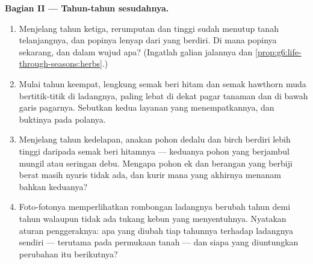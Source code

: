 \begin{problem}
\medskip\noindent\textbf{Bagian II --- Tahun-tahun sesudahnya.}
\begin{enumerate}[resume]
  \item Menjelang tahun ketiga, rerumputan dan  tinggi sudah
        menutup tanah telanjangnya, dan  popinya lenyap dari
         yang berdiri. Di mana  popinya sekarang, dan
        dalam wujud apa? (Ingatlah galian jalannya dan
        \cref{prop:g6:life-through-seasons:herbs}.)
  \item Mulai tahun keempat, lengkung semak beri hitam dan semak
        hawthorn muda bertitik-titik di ladangnya, paling lebat di
        dekat pagar tanaman dan di bawah garis pagarnya. Sebutkan kedua
        layanan yang menempatkannya, dan buktinya pada polanya.
  \item Menjelang tahun kedelapan, anakan pohon dedalu dan birch
        berdiri lebih tinggi daripada semak beri hitamnya --- keduanya
        pohon yang  berjambul mungil atau seringan debu.
        Mengapa pohon ek dan berangan yang berbiji berat masih nyaris
        tidak ada, dan kurir  mana yang akhirnya menanam bahkan
        keduanya?
  \item Foto-fotonya memperlihatkan rombongan ladangnya berubah tahun
        demi tahun walaupun tidak ada tukang kebun yang menyentuhnya.
        Nyatakan aturan penggeraknya: apa yang diubah  tiap
        tahunnya terhadap  ladangnya sendiri --- terutama
         pada permukaan tanah --- dan siapa yang diuntungkan
        perubahan itu berikutnya?
\end{enumerate}


\end{problem}
